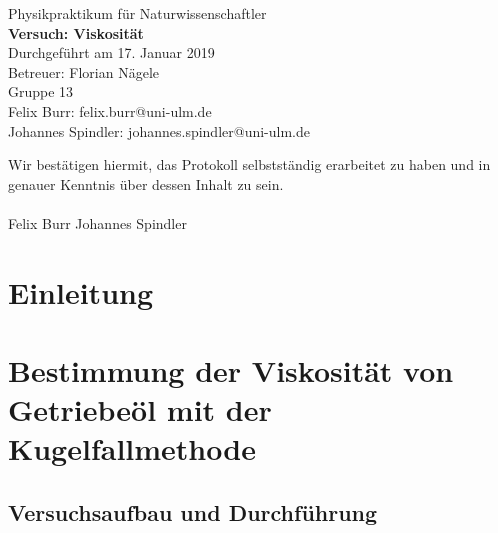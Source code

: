 \documentclass{scrartcl}
\begin{document}
\begin{titlepage}
  \begin{center}
    \vspace*{1cm}
    \LARGE
    Physikpraktikum für Naturwissenschaftler \\
    \vspace*{1cm}
    \Huge
    \textbf{Versuch: Viskosität} \\
    \vspace*{0.3cm}
    \Large
    Durchgeführt am 17. Januar 2019 \\
    Betreuer: Florian Nägele \\
    \vspace*{2.5cm}
    Gruppe 13 \\
    Felix Burr: felix.burr@uni-ulm.de \\
    Johannes Spindler: johannes.spindler@uni-ulm.de \\
    \vfill 
  \end{center}
  Wir bestätigen hiermit, das Protokoll selbstständig erarbeitet zu haben und in genauer Kenntnis über dessen Inhalt zu sein. \\
  \vspace*{0.8cm}
  \\
  Felix Burr
  \hfill
  Johannes Spindler
\end{titlepage}
\pagebreak
\tableofcontents


\pagebreak

\section{Einleitung}





\section{Bestimmung der Viskosität von Getriebeöl mit der Kugelfallmethode}
\subsection{Versuchsaufbau und Durchführung}
\end{document}
